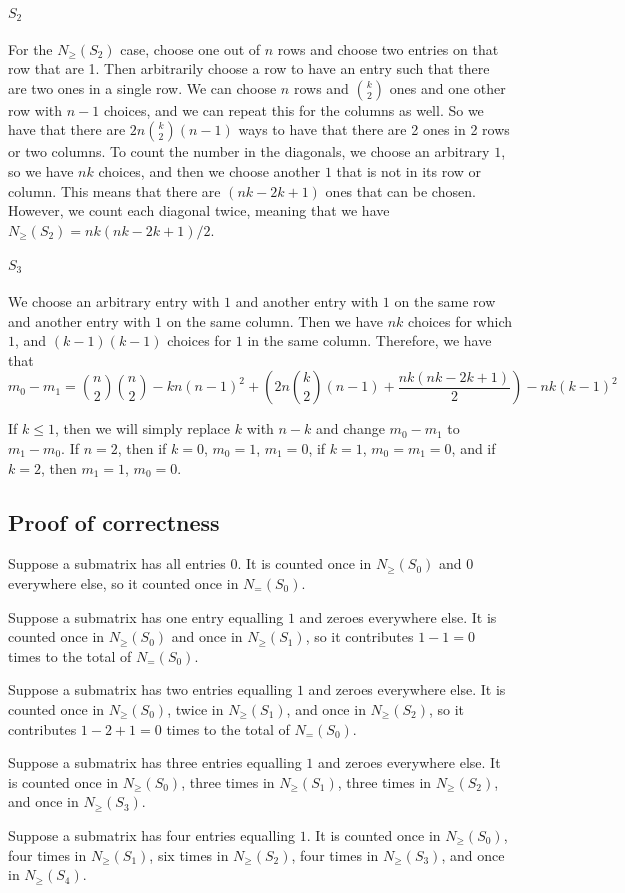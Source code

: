 \documentclass[]{article}
\begin{document}
\paragraph{$S_2$}
For the $N_{\geq}(S_2)$ case, choose one out of $n$ rows and choose two entries on that row that are 1. Then arbitrarily choose a row to have an entry such that there are two ones in a single row. We can choose $n$ rows and $\binom{k}{2}$ ones and one other row with $n-1$ choices, and we can repeat this for the columns as well. So we have that there are $2n \binom{k}{2}(n-1)$ ways to have that there are 2 ones in 2 rows or two columns. To count the number in the diagonals, we choose an arbitrary $1$, so we have $nk$ choices, and then we choose another $1$ that is not in its row or column. This means that there are $(nk - 2k + 1)$ ones that can be chosen. However, we count each diagonal twice, meaning that we have $N_{\geq}(S_2) = nk(nk - 2k + 1)/2$.
\paragraph{$S_3$}
We choose an arbitrary entry with $1$ and another entry with $1$ on the same row and another entry with $1$ on the same column. Then we have $nk$ choices for which $1$, and $(k-1)(k-1)$ choices for $1$ in the same column. Therefore, we have that 
\begin{equation}
	m_0 - m_1 = \binom{n}{2}\binom{n}{2} - kn(n-1)^2 + (2n \binom{k}{2}(n-1) + \frac{nk(nk - 2k + 1)}{2}) - nk(k-1)^2
\end{equation}

If $k \leq 1$, then we will simply replace $k$ with $n - k$ and change $m_0 - m_1$ to $m_1 - m_0$. If $n = 2$, then if $k = 0$, $m_0 = 1$, $m_1 = 0$, if $k = 1$, $m_0 = m_1 = 0$, and if $k = 2$, then $m_1 = 1$, $m_0 = 0$.
\subsection{Proof of correctness}
Suppose a submatrix has all entries 0. It is counted once in $N_{\geq}(S_0)$ and 0 everywhere else, so it counted once in $N_{=}(S_0)$. 

Suppose a submatrix has one entry equalling $1$ and zeroes everywhere else. It is counted once in $N_{\geq}(S_0)$ and once in $N_{\geq}(S_1)$, so it contributes $1 - 1 = 0$ times to the total of $N_{=}(S_0)$. 

Suppose a submatrix has two entries equalling $1$ and zeroes everywhere else. It is counted once in $N_{\geq}(S_0)$, twice in $N_{\geq}(S_1)$, and once in $N_{\geq}(S_2)$, so it contributes $1 - 2 + 1 = 0$ times to the total of $N_{=}(S_0)$.

Suppose a submatrix has three entries equalling $1$ and zeroes everywhere else. It is counted once in $N_{\geq}(S_0)$, three times in $N_{\geq}(S_1)$, three times in $N_{\geq}(S_2)$, and once in $N_{\geq}(S_3)$. 

Suppose a submatrix has four entries equalling $1$. It is counted once in $N_{\geq}(S_0)$, four times in $N_{\geq}(S_1)$, six times in $N_{\geq}(S_2)$, four times in $N_{\geq}(S_3)$, and once in $N_{\geq}(S_4)$.
\end{document}
